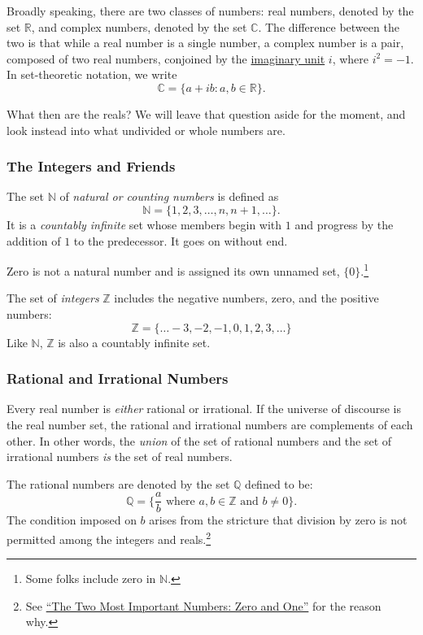 \documentclass[
  a4paper,
]{article}
\begin{document}
Broadly speaking, there are two classes of numbers: real numbers,
denoted by the set \(\mathbb{R}\), and complex numbers, denoted by the
set \(\mathbb{C}\). The difference between the two is that while a real
number is a single number, a complex number is a pair, composed of two
real numbers, conjoined by the
\href{https://en.wikipedia.org/wiki/Imaginary_unit}{imaginary unit}
\(i\), where \(i^2 = -1\). In set-theoretic notation, we write
\[\mathbb{C} = \{a + ib: a, b \in \mathbb{R}\}.
\]

What then are the reals? We will leave that question aside for the
moment, and look instead into what undivided or whole numbers are.

\subsubsection{The Integers and Friends}\label{the-integers-and-friends}

The set \(\mathbb{N}\) of \emph{natural or counting numbers} is defined
as \[
\mathbb{N} = \{1, 2, 3, \dots, n, n+1, \dots\}.
\] It is a \emph{countably infinite} set whose members begin with \(1\)
and progress by the addition of \(1\) to the predecessor. It goes on
without end.

Zero is not a natural number and is assigned its own unnamed set,
\(\{0\}\).\footnote{Some folks include zero in \(\mathbb{N}\).}

The set of \emph{integers} \(\mathbb{Z}\) includes the negative numbers,
zero, and the positive numbers: \[
\mathbb{Z} = \{\dots -3, -2, -1, 0, 1, 2, 3, \dots\}
\] Like \(\mathbb{N}\), \(\mathbb{Z}\) is also a countably infinite set.

\subsubsection{Rational and Irrational
Numbers}\label{rational-and-irrational-numbers}

Every real number is \emph{either} rational or irrational. If the
universe of discourse is the real number set, the rational and
irrational numbers are complements of each other. In other words, the
\emph{union} of the set of rational numbers and the set of irrational
numbers \emph{is} the set of real numbers.

The rational numbers are denoted by the set \(\mathbb{Q}\) defined to
be: \[
\mathbb{Q} = \{\frac{a}{b} \mbox{ where } a, b \in \mathbb{Z} \mbox{ and } b \neq 0\}.
\] The condition imposed on \(b\) arises from the stricture that
division by zero is not permitted among the integers and
reals.\footnote{See
  \href{https://swanlotus.netlify.app/blogs/the-two-most-important-numbers-zero-and-one}{``The
  Two Most Important Numbers: Zero and One''} for the reason why.}
\end{document}
